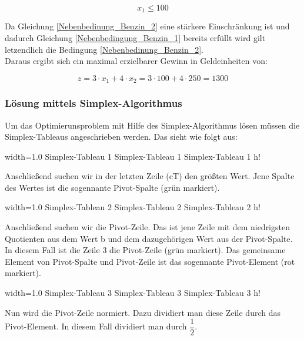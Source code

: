 \documentclass{eegreport}
\begin{document}
\begin{equation}
x_1 \leq 100
\label{Nebenbedinung_Benzin_2}
\end{equation}

Da Gleichung \ref{Nebenbedinung_Benzin_2} eine stärkere Einschränkung ist und dadurch Gleichung  \ref{Nebenbedingung_Benzin_1} bereits erfüllt wird gilt letzendlich die Bedingung \ref{Nebenbedinung_Benzin_2}.\\

Daraus ergibt sich ein maximal erzielbarer Gewinn in Geldeinheiten von:

\begin{equation}
z = 3 \cdot x_1 + 4 \cdot x_2 = 3 \cdot 100 + 4 \cdot 250 = 1300 
\end{equation}

\newpage
\subsubsection{Lösung mittels Simplex-Algorithmus}

Um das Optimierunsproblem mit Hilfe des Simplex-Algorithmus lösen müssen die Simplex-Tableaus angeschrieben werden. Das sieht wie folgt aus:

       {width=1.0\textwidth}
       {Simplex-Tableau 1}
       {Simplex-Tableau 1}
       {Simplex-Tableau 1}
       {h!}
       
Anschließend suchen wir in der letzten Zeile (cT) den größten Wert. Jene Spalte des Wertes ist die sogennante Pivot-Spalte (grün markiert).

       {width=1.0\textwidth}
       {Simplex-Tableau 2}
       {Simplex-Tableau 2}
       {Simplex-Tableau 2}
       {h!}       
       
Anschließend suchen wir die Pivot-Zeile. Das ist jene Zeile mit dem niedrigsten Quotienten aus dem Wert b und dem dazugehörigen Wert aus der Pivot-Spalte. In diesem Fall ist die Zeile 3 die Pivot-Zeile (grün markiert). Das gemeinsame Element von Pivot-Spalte und Pivot-Zeile ist das sogennante Pivot-Element (rot markiert).

       {width=1.0\textwidth}
       {Simplex-Tableau 3}
       {Simplex-Tableau 3}
       {Simplex-Tableau 3}
       {h!}      
       
Nun wird die Pivot-Zeile normiert. Dazu dividiert man diese Zeile durch das Pivot-Element. In diesem Fall dividiert man durch $\dfrac{1}{2}$.

\newpage
\end{document}
